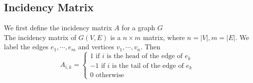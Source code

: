 \documentclass[12pt]{article}
\begin{document}
\subsection{Incidency Matrix}We first define the incidency matrix $A$ for a graph $G$\\
\newline
The incidency matrix of $G(V, E)$ is a  $n \times m$ matrix, where $n = |V|, m = |E|$. We label the edges $e_1, \cdots, e_m$ and vertices $v_1, \cdots, v_n$. Then
$$A_{i, k} = \begin{cases}
1 \text{ if }i \text{ is the head of the edge of } e_k\\
-1 \text{ if }i \text{ is the tail of the edge of } e_k\\
0 \text{ otherwise}
\end{cases}$$
\end{document}
